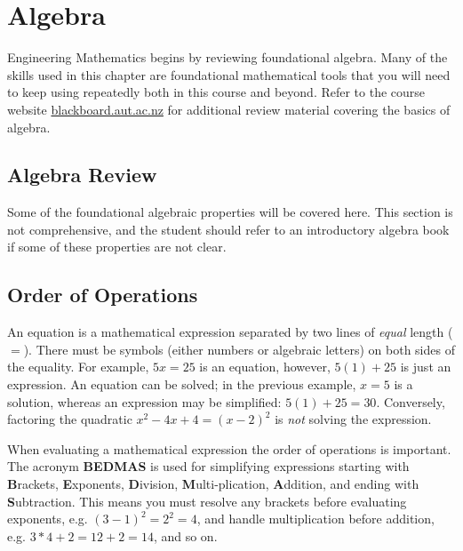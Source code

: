 \chapter{Algebra}
Engineering Mathematics begins by reviewing foundational algebra. Many of the skills used in this chapter are foundational mathematical tools that you will need to keep using repeatedly both in this course and beyond. Refer to the course website \url{blackboard.aut.ac.nz} for additional review material covering the basics of algebra.

\section{Algebra Review}\label{sec:introAlgebra}
Some of the foundational algebraic properties will be covered here. This section is not comprehensive, and the student should refer to an introductory algebra book if some of these properties are not clear.

\section*{Order of Operations}
An equation is a mathematical expression separated by two lines of \textit{equal} length ($=$). There must be symbols (either numbers or algebraic letters) on both sides of the equality. For example, $5x=25$ is an equation, however, $5(1)+25$ is just an expression. An equation can be solved; in the previous example, $x=5$ is a solution, whereas an expression may be simplified: $5(1)+25=30$. Conversely, factoring the quadratic $x^2-4x+4=(x-2)^2$ is \textit{not} solving the expression.

When evaluating a mathematical expression the order of operations is important. The acronym \textbf{BEDMAS} is used for simplifying expressions starting with \textbf{B}rackets, \textbf{E}xponents, \textbf{D}ivision, \textbf{M}ulti-\allowbreak plication, \textbf{A}ddition, and ending with \textbf{S}ubtraction. This means you must resolve any brackets before evaluating exponents, e.g. $(3-1)^2=2^2=4$, and handle multiplication before addition, e.g. $3*4+2=12+2=14$, and so on.  
